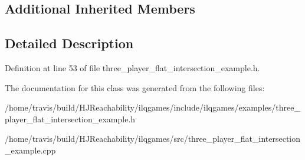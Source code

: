 \subsection*{Additional Inherited Members}


\subsection{Detailed Description}


Definition at line 53 of file three\+\_\+player\+\_\+flat\+\_\+intersection\+\_\+example.\+h.



The documentation for this class was generated from the following files\+:\begin{DoxyCompactItemize}
\item 
/home/travis/build/\+H\+J\+Reachability/ilqgames/include/ilqgames/examples/three\+\_\+player\+\_\+flat\+\_\+intersection\+\_\+example.\+h\item 
/home/travis/build/\+H\+J\+Reachability/ilqgames/src/three\+\_\+player\+\_\+flat\+\_\+intersection\+\_\+example.\+cpp\end{DoxyCompactItemize}
